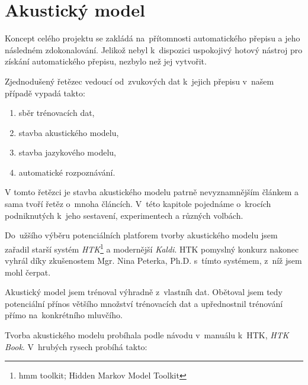 \chapter{Akustický model}
\label{kap:akusticky-model}


Koncept celého projektu se zakládá na~přítomnosti automatického přepisu a jeho
následném zdokonalování. Jelikož nebyl k~dispozici uspokojivý hotový nástroj pro
získání automatického přepisu, nezbylo než jej vytvořit.

Zjednodušený řetězec vedoucí od~zvukových dat k~jejich přepisu v~našem případě
vypadá takto:\begin{enumerate}
\item{sběr trénovacích dat,}
\item{stavba akustického modelu,}
\item{stavba jazykového modelu,}
\item{automatické rozpoznávání.}
\end{enumerate}

V tomto řetězci je stavba akustického modelu patrně nevyznamnějším článkem a
sama tvoří řetěz o~mnoha článcích. V~této kapitole pojednáme o~krocích
podniknutých k~jeho sestavení, experimentech a různých volbách.

Do~užšího výběru potenciálních platforem tvorby akustického modelu jsem zařadil
starší systém \textit{HTK}\footnote{hmm toolkit; Hidden Markov Model Toolkit} a
modernější \textit{Kaldi}. HTK pomyslný konkurz nakonec vyhrál díky zkušenostem
Mgr. Nina Peterka, Ph.D. s~tímto systémem, z~níž jsem mohl čerpat.

Akustický model jsem trénoval výhradně z~vlastníh dat. Obětoval jsem tedy
potenciální přínos většího množství trénovacích dat a upřednostnil trénování
přímo na~konkrétního mluvčího.

Tvorba akustického modelu probíhala podle návodu v~manuálu k~HTK, \textit{HTK
Book}. V~hrubých rysech probíhá takto:

